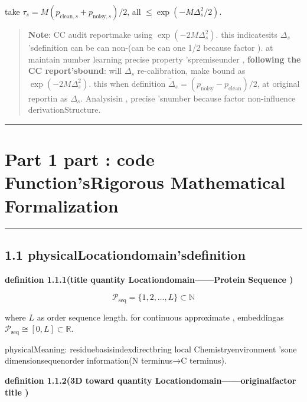 \documentclass[
  12pt,
]{article}
\begin{document}
take \(\tau_s = M(p_{\text{clean},s} + p_{\text{noisy},s})/2\), all 
\(\leq \exp(-M\Delta_s^2/2)\). 

\begin{quote}
\textbf{Note}: CC audit reportmake using  \(\exp(-2M\Delta_s^2)\). this indicatesits 
\(\Delta_s\) 'sdefinition can be can non-(can be can one  1/2
because factor ). at maintain number learning precise property 'spremiseunder , \textbf{following the CC report'sbound}: will 
\(\Delta_s\) re-calibration, make  bound as 
\(\exp(-2M\Delta_s^2)\). this when definition 
\(\tilde{\Delta}_s = (p_{\text{noisy}} - p_{\text{clean}})/2\), at original reportin as 
\(\Delta_s\). Analysisin , precise 'snumber because factor non-influence derivationStructure. 
\end{quote}

\begin{center}\rule{0.5\linewidth}{0.5pt}\end{center}

\section{Part 1
part : code Function'sRigorous Mathematical Formalization }\label{ux7b2c-1-ux90e8ux5206ux7f16ux7801ux51fdux6570ux7684ux4e25ux5bc6ux6570ux5b66ux5f62ux5f0fux5316}

\begin{center}\rule{0.5\linewidth}{0.5pt}\end{center}

\subsection{1.1
physicalLocationdomain'sdefinition }\label{ux4e09ux79cdux7269ux7406ux4f4dux7f6eux57dfux7684ux5b9aux4e49}

\textbf{definition  1.1.1(title quantity Locationdomain------Protein Sequence )}

\[\mathcal{P}_{\text{seq}} = \{1, 2, \ldots, L\} \subset \mathbb{N}\]

where \(L\) as order sequence length. for continuous approximate , embeddingas 
\(\mathcal{P}_{\text{seq}} \cong [0, L] \subset \mathbb{R}\). 

physicalMeaning: residuebasisindexdirectbring local Chemistryenvironment 'sone dimensionsequenorder information(N terminus→C terminus). 

\textbf{definition  1.1.2(3D toward quantity Locationdomain------originalfactor title )}
\end{document}
